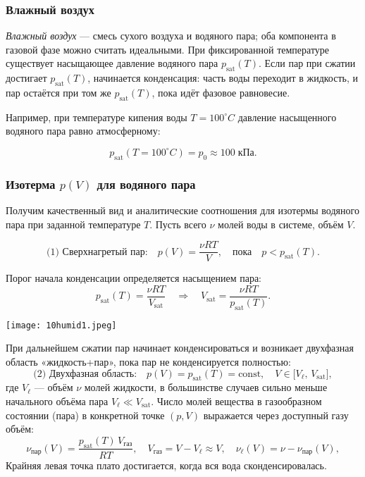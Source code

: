 \documentclass[12pt, a4paper]{article}%
\begin{document}
\subsubsection*{Влажный воздух}
\textit{Влажный воздух} — смесь сухого воздуха и водяного пара; оба компонента в газовой фазе можно считать идеальными. При фиксированной температуре существует насыщающее давление водяного пара \(p_{\text{sat}}(T)\). Если пар при сжатии достигает \(p_{\text{sat}}(T)\), начинается конденсация: часть воды переходит в жидкость, и пар остаётся при том же \(p_{\text{sat}}(T)\), пока идёт фазовое равновесие.

Например, при температуре кипения воды $T = 100^\circ C$ давление насыщенного водяного пара равно атмосферному:

\[
p_\text{sat}(T = 100^\circ C) = p_0 \approx 100\; \text{кПа}.
\]


\subsubsection*{Изотерма \(p(V)\) для водяного пара }
Получим качественный вид и аналитические соотношения для изотермы водяного пара при заданной температуре \(T\).
Пусть всего \(\nu\) молей воды в системе, объём \(V\).

\[
\text{(1) Сверхнагретый пар:}\quad p(V)=\frac{\nu R T}{V},\quad \text{пока}\quad p < p_{\text{sat}}(T).
\]

Порог начала конденсации определяется насыщением пара:
\[
p_{\text{sat}}(T)=\frac{\nu R T}{V_{\text{sat}}}\quad\Longrightarrow\quad V_{\text{sat}}=\frac{\nu R T}{p_{\text{sat}}(T)}.
\]


\begin{center}
\texttt{[image: 10humid1.jpeg]}
\label{fig:mpr}
\end{center}


При дальнейшем сжатии пар начинает конденсироваться и возникает двухфазная область «жидкость+пар», пока пар не конденсируется полностью:
\[
\text{(2) Двухфазная область:}\quad p(V)=p_{\text{sat}}(T)=\text{const},\quad V\in\bigl[V_{\ell},\,V_{\text{sat}}\bigr],
\]
где $V_\ell$ --- объём $\nu$ молей жидкости, в большинстве случаев сильно меньше начального объёма пара $V_\ell \ll V_\text{sat}$.
Число молей вещества в газообразном состоянии (пара) в конкретной точке $(p, V)$ выражается через доступный газу объём:
\[
\nu_{\text{пар}}(V)=\frac{p_{\text{sat}}(T)\,V_{\text{газ}}}{R T},\quad
V_{\text{газ}}=V-V_{\ell}\approx V,\quad
\nu_{\ell}(V)=\nu-\nu_{\text{пар}}(V),
\]
Крайняя левая точка плато достигается, когда вся вода сконденсировалась.
\end{document}
